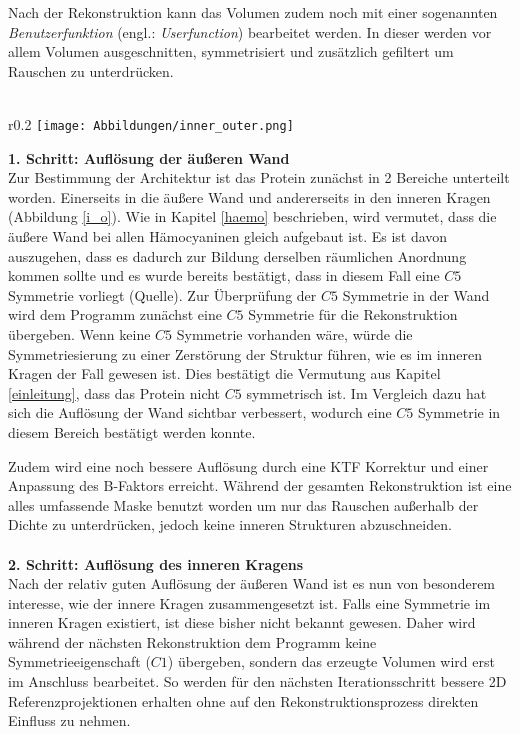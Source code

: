 Nach der Rekonstruktion kann das Volumen zudem noch mit einer sogenannten \textit{Benutzerfunktion} (engl.: \textit{Userfunction}) bearbeitet werden. In dieser werden vor allem Volumen ausgeschnitten, symmetrisiert und zusätzlich gefiltert um Rauschen zu unterdrücken.
\\
\\
\begin{wrapfigure}{r}{0.2\textwidth}
	\centering
	\texttt{[image: Abbildungen/inner\_outer.png]}
	\caption[Trennung des Proteins in zwei Bereiche]{Orange: Innerer Kragen; Blau: Äußere Wand}
	\label{i_o}
\end{wrapfigure}
\textbf{1. Schritt: Auflösung der äußeren Wand}\\
Zur Bestimmung der Architektur ist das Protein zunächst in 2 Bereiche unterteilt worden.
Einerseits in die äußere Wand und andererseits in den inneren Kragen (Abbildung \ref{i_o}).
Wie in Kapitel \ref{haemo} beschrieben, wird vermutet, dass die äußere Wand bei allen Hämocyaninen gleich aufgebaut ist.
Es ist davon auszugehen, dass es dadurch zur Bildung derselben räumlichen Anordnung kommen sollte und es wurde bereits bestätigt, dass in diesem Fall eine $C5$ Symmetrie vorliegt (Quelle).
Zur Überprüfung der $C5$ Symmetrie in der Wand wird dem Programm zunächst eine $C5$ Symmetrie für die Rekonstruktion übergeben.
Wenn keine $C5$ Symmetrie vorhanden wäre, würde die Symmetriesierung zu einer Zerstörung der Struktur führen, wie es im inneren Kragen der Fall gewesen ist.
Dies bestätigt die Vermutung aus Kapitel \ref{einleitung}, dass das Protein nicht $C5$ symmetrisch ist.
Im Vergleich dazu hat sich die Auflösung der Wand sichtbar verbessert, wodurch eine $C5$ Symmetrie in diesem Bereich bestätigt werden konnte.

Zudem wird eine noch bessere Auflösung durch eine KTF Korrektur und einer Anpassung des B-Faktors erreicht.
Während der gesamten Rekonstruktion ist eine alles umfassende Maske benutzt worden um nur das Rauschen außerhalb der Dichte zu unterdrücken, jedoch keine inneren Strukturen abzuschneiden.
\\
\\
\textbf{2. Schritt: Auflösung des inneren Kragens}\\
Nach der relativ guten Auflösung der äußeren Wand ist es nun von besonderem interesse, wie der innere Kragen zusammengesetzt ist.
Falls eine Symmetrie im inneren Kragen existiert, ist diese bisher nicht bekannt gewesen.
Daher wird während der nächsten Rekonstruktion dem Programm keine Symmetrieeigenschaft ($C1$) übergeben, sondern das erzeugte Volumen wird erst im Anschluss bearbeitet.
So werden für den nächsten Iterationsschritt bessere 2D Referenzprojektionen erhalten ohne auf den Rekonstruktionsprozess direkten Einfluss zu nehmen.

